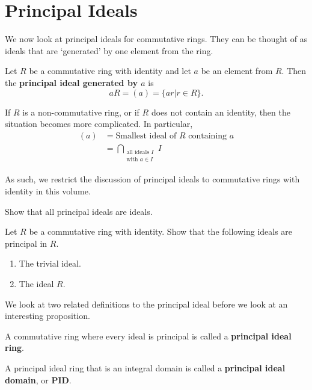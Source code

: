 \section{Principal Ideals}
We now look at principal ideals for commutative rings. They can be thought of as ideals that are `generated' by one element from the ring.
\begin{definition}
    Let $R$ be a commutative ring with identity and let $a$ be an element from $R$. Then the \textbf{principal ideal generated by $a$} is
    \[
        aR = (a) = \{ar \vert r \in R\}.
    \]
\end{definition}
\begin{remark}
    If $R$ is a non-commutative ring, or if $R$ does not contain an identity, then the situation becomes more complicated. In particular,
    \begin{align*}
        (a) &= \text{Smallest ideal of } R \text{ containing }a\\
        &= \bigcap_{\substack{\text{all ideals }I \\ \text{with } a \in I}}I
    \end{align*}
    
    As such, we restrict the discussion of principal ideals to commutative rings with identity in this volume.
\end{remark}
\begin{exercise}
    Show that all principal ideals are ideals.
\end{exercise}
\begin{exercise}
    Let $R$ be a commutative ring with identity. Show that the following ideals are principal in $R$.
    \begin{enumerate}[label=(\alph*)]
        \item The trivial ideal.
        \item The ideal $R$.
    \end{enumerate}
\end{exercise}

We look at two related definitions to the principal ideal before we look at an interesting proposition.
\begin{definition}
    A commutative ring where every ideal is principal is called a \textbf{principal ideal ring}.
\end{definition}
\begin{definition}
    A principal ideal ring that is an integral domain is called a \textbf{principal ideal domain}, or \textbf{PID}.
\end{definition}


